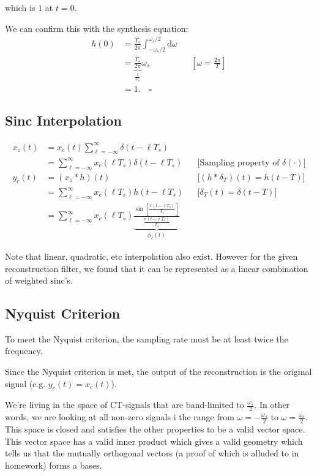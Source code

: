 which is $1$ at $t=0$.

We can confirm this with the synthesis equation:
\begin{align*}
    h(0) 
    &= \frac{T_s}{2\pi}\int_{-\omega_s/2}^{\omega_s/2}  \mathrm d \omega
    \\
    &= \underbrace{\frac{T_s}{2\pi}}_{\frac1{\omega_s}} \omega_s
    &&\left[\omega = \frac{2\pi}T\right]
    \\
    &= 1.\quad\square
\end{align*}

\hrulefill

\subsection{Sinc Interpolation}
\begin{align*}
    x_z(t) 
    &= x_c(t) \sum_{\ell=-\infty}^\infty \delta(t-\ell T_s)
    \\
    &=\sum_{\ell=-\infty}^\infty x_c(\ell T_s) \delta(t-\ell T_s)
    &&\text{[Sampling property of $\delta(\cdot)$]}
    \\
    y_c(t) 
    &= (x_z \ast h)(t)
    &&\text{[$(h\ast \delta_T)(t)=h(t-T)$]}
    \\
    &=\sum_{\ell=-\infty}^\infty x_c(\ell T_s) h(t-\ell T_s)
    &&\text{[$\delta_T(t)=\delta(t-T)$]}
    \\
    &=\sum_{\ell=-\infty}^\infty x_c(\ell T_s) 
    \underbrace{\frac{\sin\left[\frac{\pi(t-\ell T_s)}{T_s}\right]}{\frac{\pi(t-\ell T_s)}{T_s}}}_{\phi_\ell(t)}
\end{align*}

Note that linear, quadratic, etc interpolation also exist. However for the given reconstruction filter, we found that it can be represented as a linear combination of weighted $\text{sinc}$'s.

\subsection{Nyquist Criterion}
To meet the Nyquist criterion, the sampling rate must be at least twice the frequency.

Since the Nyquist criterion is met, the output of the reconstruction is the original signal (e.g. $y_c(t)=x_c(t)$).

We're living in the space of CT-signals that are band-limited to $\frac{\omega_s}2$. In other words, we are looking at all non-zero signals i the range from $\omega=-\frac{\omega_s}{2}$ to $\omega=\frac{\omega_s}{2}$. This space is closed and satisfies the other properties to be a valid vector space. This vector space has a valid inner product which gives a valid geometry which tells us that the mutually orthogonal vectors (a proof of which is alluded to in homework) forms a bases.

